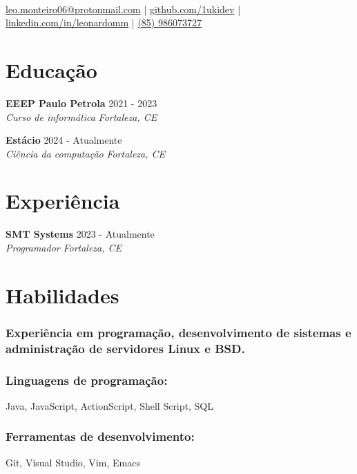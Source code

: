 \documentclass{article}
\author{Leonardo M. Moreira}
\makeatletter
\renewcommand{\maketitle}{
    \begin{center}
        {\huge\bfseries\theauthor} \\
        \href{mailto:leo.monteiro06@protonmail.com}{leo.monteiro06@protonmail.com} |
        \href{https://github.com/1ukidev}{github.com/1ukidev} |
        \href{https://www.linkedin.com/in/leonardomm}{linkedin.com/in/leonardomm} |
        \href{https://wa.me/85986073727}{(85) 986073727}
    \end{center}
}
\newenvironment{rSubsection2}[4]{
 {\bf #1} \hfill {#2}
 \\
 {\em #3} \hfill {\em #4} {\parfillskip0pt\par}
 \vspace{0.5em}
}
\makeatother
\begin{document}
\maketitle

\section{Educação}
    \begin{rSubsection2}
        {EEEP Paulo Petrola}{2021 - 2023}{Curso de informática}{Fortaleza, CE}
    \end{rSubsection2}
    \begin{rSubsection2}
        {Estácio}{2024 - Atualmente}{Ciência da computação}{Fortaleza, CE}
    \end{rSubsection2}
\vspace{-1em}

\section{Experiência}
    \begin{rSubsection2}
        {SMT Systems}{2023 - Atualmente}{Programador}{Fortaleza, CE}
    \end{rSubsection2}
\vspace{-1em}

\section{Habilidades}
    \subsubsection
    {Experiência em programação, desenvolvimento de sistemas e administração de servidores Linux e BSD.}
    \hfill
    \vspace{-1em}

    \subsubsection
    {Linguagens de programação:}
    Java, JavaScript, ActionScript, Shell Script, SQL 
    \vspace{-1.5em}

    \subsubsection
    {Ferramentas de desenvolvimento:}
    Git, Visual Studio, Vim, Emacs
    \vspace{-1.5em}
\end{document}
